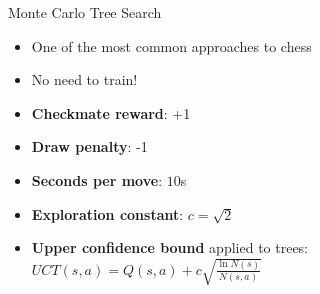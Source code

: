 \begin{frame}{Monte Carlo Tree Search}
  \begin{itemize}
    \item One of the most common approaches to chess
    \item No need to train!
    \item \textbf{Checkmate reward}: +1
    \item \textbf{Draw penalty}: -1
    \item \textbf{Seconds per move}: $10$s
    \item \textbf{Exploration constant}: $c=\sqrt{2}$
    \item \textbf{Upper confidence bound} applied to trees:
    $UCT(s,a) = Q(s,a) + c \sqrt{\frac{\ln N(s)}{N(s,a)}}$
  \end{itemize}
\end{frame}
